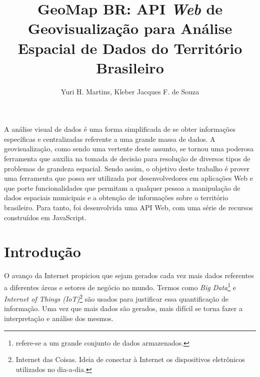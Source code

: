 \documentclass[12pt]{article}
\title{GeoMap BR: API \emph{Web} de Geovisualização para Análise Espacial de Dados do Território Brasileiro }
\author{Yuri H. Martins\inst{1}, Kleber Jacques F. de Souza\inst{1}}
\begin{document}
 

\maketitle

\begin{resumo} 

A análise visual de dados é uma forma simplificada de se obter informações específicas e centralizadas referente a uma grande massa de dados. A geovisualização, como sendo uma vertente deste assunto, se tornou uma poderosa ferramenta que auxilia na tomada de decisão para resolução de diversos tipos de problemas de grandeza espacial. Sendo assim, o objetivo deste trabalho é prover uma ferramenta que possa ser utilizada por desenvolvedores em aplicações Web e que porte funcionalidades que permitam a qualquer pessoa a manipulação de dados espaciais municipais e a obtenção de informações sobre o território brasileiro. Para tanto, foi desenvolvida uma API Web, com uma série de recursos construídos em JavaScript.

\end{resumo}

     
\section{Introdução} \label{introducao}

O avanço da Internet propiciou que sejam gerados cada vez mais dados referentes a diferentes áreas e setores de negócio no mundo. Termos como \emph{Big Data}\footnote{refere-se a um grande conjunto de dados armazenados.} e \emph{Internet of Things (IoT)}\footnote{Internet das Coisas. Ideia de conectar à Internet os dispositivos eletrônicos utilizados no dia-a-dia.} são usados para justificar essa quantificação de informação. Uma vez que mais dados são gerados, mais difícil se torna fazer a interpretação e análise dos mesmos.
\end{document}
